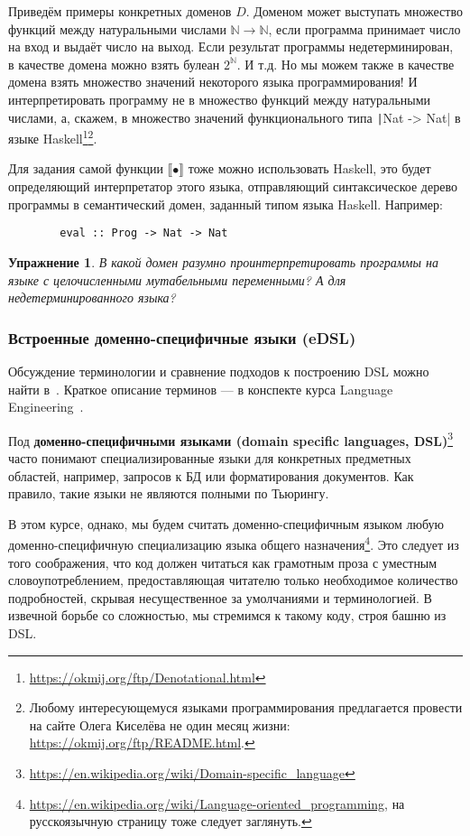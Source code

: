 \documentclass[12pt]{article}
\newcommand{\vocab}[1]{\textbf{#1}} %
\newcommand{\sembr}[1]{\llbracket{#1}\rrbracket} %
\newtheorem{task}{Упражнение}
\begin{document}
    Приведём примеры конкретных доменов $D$.
    Доменом может выступать множество функций между натуральными числами $\mathbb{N}\to\mathbb{N}$, если программа принимает число на вход и выдаёт число на выход.
    Если результат программы недетерминирован, в качестве домена можно взять булеан $2^\mathbb{N}$.
    И т.д.
    Но мы можем также в качестве домена взять множество значений некоторого языка программирования!
    И интерпретировать программу не в множество функций между натуральными числами, а, скажем, в множество значений функционального типа \texttt|Nat -> Nat| в языке Haskell\footnote{\url{https://okmij.org/ftp/Denotational.html}}\footnote{Любому интересующемуся языками программирования предлагается провести на сайте Олега Киселёва не один месяц жизни: \url{https://okmij.org/ftp/README.html}.}.

    Для задания самой функции $\sembr{\bullet}$ тоже можно использовать Haskell, это будет определяющий интерпретатор этого языка, отправляющий синтаксическое дерево программы в семантический домен, заданный типом языка Haskell.
    Например:
    \begin{verbatim}
        eval :: Prog -> Nat -> Nat
    \end{verbatim}

    \begin{task}
        В какой домен разумно проинтерпретировать программы на языке с целочисленными мутабельными переменными?
        А для недетерминированного языка?
    \end{task}

    \subsubsection{Встроенные доменно-специфичные языки (eDSL)}

    Обсуждение терминологии и сравнение подходов к построению DSL можно найти в~\cite{gibbons2013functional}.
    Краткое описание терминов --- в конспекте курса Language Engineering~\cite{languageEngineering}.

    Под \vocab{доменно-специфичными языками (domain specific languages, DSL)}\footnote{\url{https://en.wikipedia.org/wiki/Domain-specific_language}} часто понимают специализированные языки для конкретных предметных областей, например, запросов к БД или форматирования документов.
    Как правило, такие языки не являются полными по Тьюрингу.

    В этом курсе, однако, мы будем считать доменно-специфичным языком любую доменно-специфичную специализацию языка общего назначения\footnote{\url{https://en.wikipedia.org/wiki/Language-oriented_programming}, на русскоязычную страницу тоже следует заглянуть.}.
    Это следует из того соображения, что код должен читаться как грамотным проза с уместным словоупотреблением, предоставляющая читателю только необходимое количество подробностей, скрывая несущественное за умолчаниями и терминологией.
    В извечной борьбе со сложностью, мы стремимся к такому коду, строя башню из DSL\@.
\end{document}
